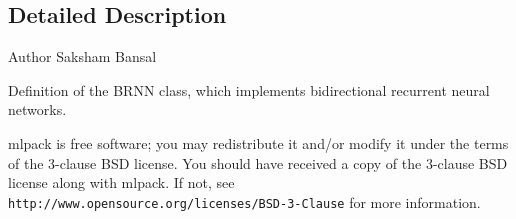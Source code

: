 \subsection{Detailed Description}
\begin{DoxyAuthor}{Author}
Saksham Bansal
\end{DoxyAuthor}
Definition of the B\+R\+NN class, which implements bidirectional recurrent neural networks.

mlpack is free software; you may redistribute it and/or modify it under the terms of the 3-\/clause B\+SD license. You should have received a copy of the 3-\/clause B\+SD license along with mlpack. If not, see {\tt http\+://www.\+opensource.\+org/licenses/\+B\+S\+D-\/3-\/\+Clause} for more information. 